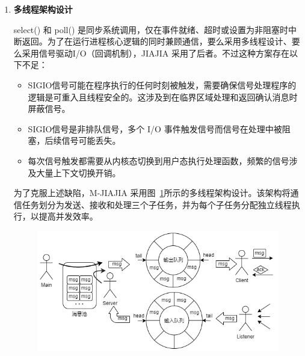 {\begin{enumerate}[label=\arabic*.]
    因此 M-JIAJIA 在IO多路复用设计上选择使用 epoll 接口，并采用边缘触发模式，以适应软件 DSM 系统大规模并发通信场景，尽管这在一定程度上会影响可移植性，但其优势仍使其成为更优的选择。具体使用流程如下（见算法~\ref{alg:listen-thread}）：
    \begin{itemize}
        \item 调用 epoll\_create() 创建 epoll 实例。
        \item 创建并初始化 epoll\_event 结构，该结构将关联接收文件描述符与监听模式为可读事件（EPOLLIN）与边缘触发（EPOLLET）；然后调用 epoll\_ctl 将文件描述符关联到 epoll 实例。
        \item 循环调用 epoll\_wait() 得到就绪事件，遍历就绪事件读取消息。
    \end{itemize}
    \item \textbf{多线程架构设计}

    select() 和 poll() 是同步系统调用，仅在事件就绪、超时或设置为非阻塞时中断返回。为了在运行进程核心逻辑的同时兼顾通信，要么采用多线程设计、要么采用信号驱动I/O（回调机制），JIAJIA 采用了后者。不过这种方案存在以下不足：
    \begin{itemize}
        \item SIGIO信号可能在程序执行的任何时刻被触发，需要确保信号处理程序的逻辑是可重入且线程安全的。这涉及到在临界区域处理和返回确认消息时屏蔽信号。
        \item SIGIO信号是非排队信号，多个 I/O 事件触发信号而信号在处理中被阻塞，后续信号可能丢失。
        \item 每次信号触发都需要从内核态切换到用户态执行处理函数，频繁的信号涉及大量上下文切换开销。
    \end{itemize}
    
    为了克服上述缺陷，M-JIAJIA 采用图~\ref{fig:mjiajia-multithread}所示的多线程架构设计。该架构将通信任务划分为发送、接收和处理三个子任务，并为每个子任务分配独立线程执行，以提高并发效率。
    \begin{figure}[H]
        \centering
        \includegraphics[width=1.0\textwidth]{Img/Multithread-arch.png}
        \label{fig:mjiajia-multithread}
    \end{figure}


\end{enumerate}}
